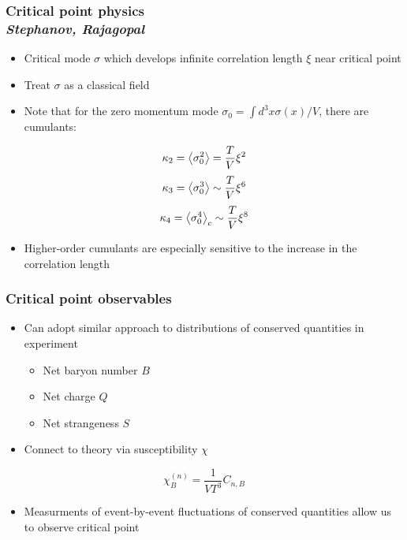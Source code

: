 \documentclass[accentcolor=tud2c,usenames,dvipsnames,colorbacktitle,inverttitle,landscape,german,presentation,t]{tudbeamer}
\begin{document}
  \begin{frame}
    \frametitle{Critical point physics \\ \small{\textit{Stephanov,
    Rajagopal}}}
    \begin{itemize}
      \item Critical mode $\sigma$ which develops infinite correlation length
        $\xi$ near critical point
      \item Treat $\sigma$ as a classical field
      \item Note that for the zero momentum mode $\sigma_0 = \int d^3x
        \sigma(x)/V$, there are cumulants:
    \end{itemize}
    \begin{equation*}
      \kappa_2 = \expectationvalue{\sigma_{0}^{2}} = \frac{T}{V} \xi^2
    \end{equation*}
    \begin{equation*}
      \kappa_3 = \expectationvalue{\sigma_{0}^{3}} \sim \frac{T}{V} \xi^6
    \end{equation*}
    \begin{equation*}
      \kappa_4 = \expectationvalue{\sigma_{0}^{4}}_c \sim \frac{T}{V} \xi^8
    \end{equation*}
    \begin{itemize}
      \item Higher-order cumulants are especially sensitive to the increase in
        the correlation length
      \end{itemize}
  \end{frame}

  \begin{frame}
    \frametitle{Critical point observables}
    \begin{itemize}
      \item Can adopt similar approach to distributions of conserved quantities
        in experiment
      \begin{itemize}
        \item Net baryon number $B$
        \item Net charge $Q$
        \item Net strangeness $S$
      \end{itemize}
      \item Connect to theory via susceptibility $\chi$
    \end{itemize}
    \begin{equation*}
      \chi_{B}^{(n)} = \frac{1}{V T^3} C_{n,B}
    \end{equation*}
    \begin{itemize}
      \item Measurments of event-by-event fluctuations of conserved quantities allow
        us to observe critical point
    \end{itemize}
  \end{frame}
\end{document}
